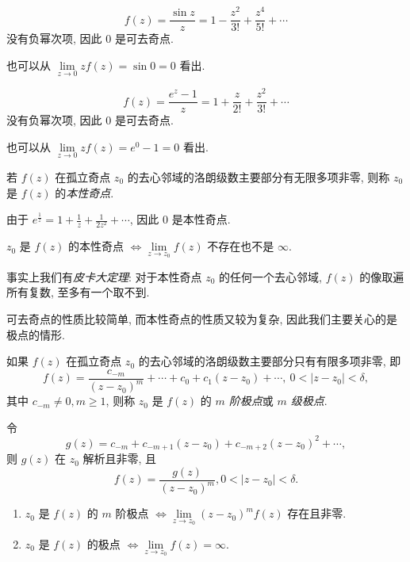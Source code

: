 \documentclass[nocolor,theme=doremi,lang=cn,11pt,chinese,twoside,openright,usesamecnt]{elegantbook}
\begin{document}
\begin{example}
		\[f(z)=\frac{\sin z}z=1-\dfrac{z^2}{3!}+\dfrac{z^4}{5!}+\cdots\]
		没有负幂次项, 因此 $0$ 是可去奇点.

	{也可以从 $\lim\limits_{z\to0}zf(z)=\sin 0=0$ 看出.
	}
\end{example}

\begin{example}
		\[f(z)=\frac{e^z-1}z=1+\dfrac z{2!}+\dfrac{z^2}{3!}+\cdots\]
		没有负幂次项, 因此 $0$ 是可去奇点.

	{也可以从 $\lim\limits_{z\to0}zf(z)=e^0-1=0$ 看出.
	}
\end{example}

\begin{definition}
	若 $f(z)$ 在孤立奇点 $z_0$ 的去心邻域的洛朗级数主要部分有无限多项非零, 则称 $z_0$ 是 $f(z)$ 的\emph{本性奇点}.
\end{definition}

\begin{example}
	由于 $\displaystyle e^{\frac1z}=1+\frac1z+\frac1{2z^2}+\cdots$, 因此 $0$ 是本性奇点.
\end{example}

\begin{theorem}
	$z_0$ 是 $f(z)$ 的本性奇点 $\iff\lim\limits_{z\to z_0}f(z)$ 不存在也不是 $\infty$.
\end{theorem}

事实上我们有\emph{皮卡大定理}: 对于本性奇点 $z_0$ 的任何一个去心邻域, $f(z)$ 的像取遍所有复数, 至多有一个取不到.

可去奇点的性质比较简单, 而本性奇点的性质又较为复杂, 因此我们主要关心的是极点的情形.

\begin{definition}
	如果 $f(z)$ 在孤立奇点 $z_0$ 的去心邻域的洛朗级数主要部分只有有限多项非零, 即
	\[f(z)=\frac{c_{-m}}{(z-z_0)^m}+\cdots+c_0+c_1(z-z_0)+\cdots,\ 0<|z-z_0|<\delta,\]
	其中 $c_{-m}\neq 0,m\ge 1$, 则称 $z_0$ 是 $f(z)$ 的 \emph{$m$ 阶极点}或 \emph{$m$ 级极点}.
\end{definition}

令
\[g(z)=c_{-m}+c_{-m+1}(z-z_0)+c_{-m+2}(z-z_0)^2+\cdots,\]
则 $g(z)$ 在 $z_0$ 解析且非零,
且
\[f(z)=\dfrac{g(z)}{(z-z_0)^m},0<|z-z_0|<\delta.\]

\begin{theorem}
	\begin{enumerate}
		\item $z_0$ 是 $f(z)$ 的 $m$ 阶极点 $\iff\lim\limits_{z\to z_0}(z-z_0)^mf(z)$ 存在且非零.
		\item $z_0$ 是 $f(z)$ 的极点 $\iff\lim\limits_{z\to z_0}f(z)=\infty$.
	\end{enumerate}
\end{theorem}
\end{document}
